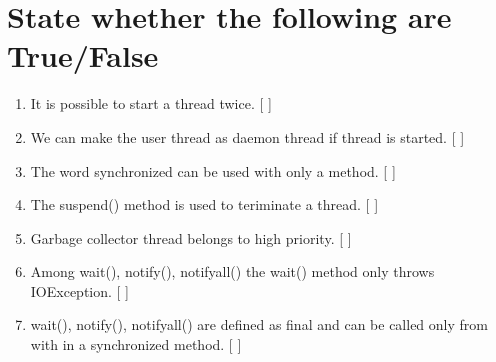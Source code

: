 \documentclass[11pt,a4paper]{article}
\begin{document}
\section*{State whether the following are True/False}
\begin{enumerate}
\item It is possible to start a thread twice. [   ]
\item We can make the user thread as daemon thread if thread is started. [  ]
\item The word synchronized can be used with only a method. [  ]
\item The suspend() method is used to teriminate a thread. [  ]
\item Garbage collector thread belongs to high priority. [   ]
\item Among wait(), notify(), notifyall() the wait() method only throws IOException. [   ]
\item  wait(), notify(), notifyall() are defined as final and can be called only from with in a synchronized method. [   ]
\end{enumerate}
\end{document}

